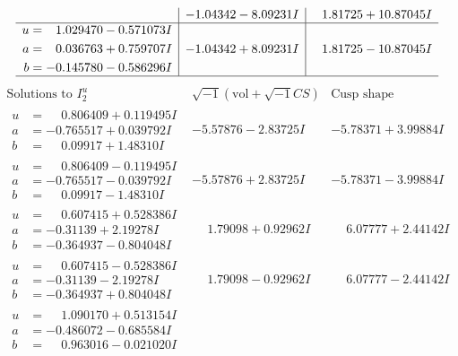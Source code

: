 \documentclass[1p]{elsarticle_modified}
\theoremstyle{definition}
\newcommand{\I}{\sqrt{-1}}
\begin{document}
$$\begin{array}{c|c|c}
 & -1.04342 - 8.09231 I & \phantom{-}1.81725 + 10.87045 I \\ \hline\begin{aligned}
u &= \phantom{-}1.029470 - 0.571073 I \\
a &= \phantom{-}0.036763 + 0.759707 I \\
b &= -0.145780 - 0.586296 I\end{aligned}
 & -1.04342 + 8.09231 I & \phantom{-}1.81725 - 10.87045 I\\
 \hline 
 \end{array}$$\newpage$$\begin{array}{c|c|c}  
\text{Solutions to }I^u_{2}& \I (\text{vol} + \sqrt{-1}CS) & \text{Cusp shape}\\
 \hline 
\begin{aligned}
u &= \phantom{-}0.806409 + 0.119495 I \\
a &= -0.765517 + 0.039792 I \\
b &= \phantom{-}0.09917 + 1.48310 I\end{aligned}
 & -5.57876 - 2.83725 I & -5.78371 + 3.99884 I \\ \hline\begin{aligned}
u &= \phantom{-}0.806409 - 0.119495 I \\
a &= -0.765517 - 0.039792 I \\
b &= \phantom{-}0.09917 - 1.48310 I\end{aligned}
 & -5.57876 + 2.83725 I & -5.78371 - 3.99884 I \\ \hline\begin{aligned}
u &= \phantom{-}0.607415 + 0.528386 I \\
a &= -0.31139 + 2.19278 I \\
b &= -0.364937 - 0.804048 I\end{aligned}
 & \phantom{-}1.79098 + 0.92962 I & \phantom{-}6.07777 + 2.44142 I \\ \hline\begin{aligned}
u &= \phantom{-}0.607415 - 0.528386 I \\
a &= -0.31139 - 2.19278 I \\
b &= -0.364937 + 0.804048 I\end{aligned}
 & \phantom{-}1.79098 - 0.92962 I & \phantom{-}6.07777 - 2.44142 I \\ \hline\begin{aligned}
u &= \phantom{-}1.090170 + 0.513154 I \\
a &= -0.486072 - 0.685584 I \\
b &= \phantom{-}0.963016 - 0.021020 I\end{aligned}

\end{array}$$
\end{document}
